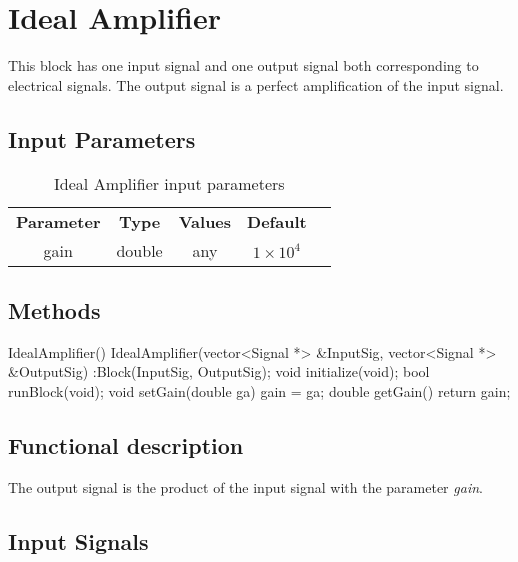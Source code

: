 \clearpage

\section{Ideal Amplifier}

\maketitle

This block has one input signal and one output signal both corresponding to electrical signals. The output signal is a perfect amplification of the input signal.


\subsection*{Input Parameters}


\begin{table}[h]
	\centering
	\begin{tabular}{|c|c|c|c|c}
		\cline{1-4}
		\textbf{Parameter} & \textbf{Type} &\textbf{Values} &   \textbf{Default}& \\ \cline{1-4}
		gain 	   		 & double & any 	& $1 \times 10^{4}$& \\ \cline{1-4} \cline{1-4}
	\end{tabular}
	\caption{Ideal Amplifier input parameters}
	\label{table:idealamp_in_par}
\end{table}


\subsection*{Methods}
 
IdealAmplifier() {}
\bigbreak
IdealAmplifier(vector<Signal *> \&InputSig, vector<Signal *> \&OutputSig) :Block(InputSig, OutputSig){};
\bigbreak
void initialize(void);
\bigbreak
bool runBlock(void);
\bigbreak
void setGain(double ga) { gain = ga; }
\bigbreak
double getGain() { return gain; }


\subsection*{Functional description}

The output signal is the product of the input signal with the parameter \textit{gain}. 

\pagebreak

\subsection*{Input Signals}

